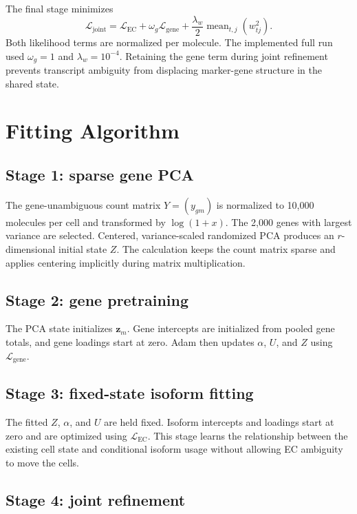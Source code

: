 \documentclass[11pt]{article}
\begin{document}
The final stage minimizes
\[
  \mathcal L_{\mathrm{joint}}
  =
  \mathcal L_{\mathrm{EC}}
  +\omega_g\mathcal L_{\mathrm{gene}}
  +\frac{\lambda_w}{2}\operatorname{mean}_{t,j}(w_{tj}^2).
\]
Both likelihood terms are normalized per molecule. The implemented full run
used \(\omega_g=1\) and \(\lambda_w=10^{-4}\). Retaining the gene term during
joint refinement prevents transcript ambiguity from displacing
marker-gene structure in the shared state.

\section*{Fitting Algorithm}

\subsection*{Stage 1: sparse gene PCA}

The gene-unambiguous count matrix \(Y=(y_{gm})\) is normalized to 10,000
molecules per cell and transformed by \(\log(1+x)\). The 2,000 genes with
largest variance are selected. Centered, variance-scaled randomized PCA
produces an \(r\)-dimensional initial state \(Z\). The calculation keeps the
count matrix sparse and applies centering implicitly during matrix
multiplication.

\subsection*{Stage 2: gene pretraining}

The PCA state initializes \(\bm z_m\). Gene intercepts are initialized from
pooled gene totals, and gene loadings start at zero. Adam then updates
\(\alpha\), \(U\), and \(Z\) using \(\mathcal L_{\mathrm{gene}}\).

\subsection*{Stage 3: fixed-state isoform fitting}

The fitted \(Z\), \(\alpha\), and \(U\) are held fixed. Isoform intercepts and
loadings start at zero and are optimized using
\(\mathcal L_{\mathrm{EC}}\). This stage learns the relationship between the
existing cell state and conditional isoform usage without allowing EC
ambiguity to move the cells.

\subsection*{Stage 4: joint refinement}
\end{document}
